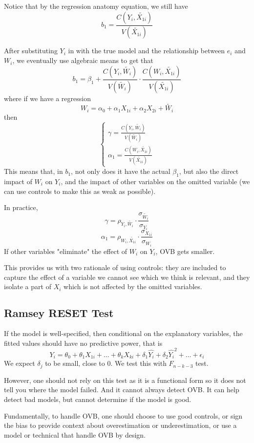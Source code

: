 Notice that by the regression anatomy equation, we still have
$$b_1 = \frac{C(Y_i, \tilde{X_{1i}})}{V(\tilde{X_{1i}})}$$

After substituting $Y_i$ in with the true model and the relationship between $e_i$ and $W_i$, we eventually use algebraic means to get that
$$b_1 = \beta_1 + \frac{C(Y_i, \tilde{W_i})}{V(\tilde{W_i})} \cdot \frac{C(W_i, \tilde{X_{1i}})}{V(\tilde{X_{1i}})}$$
where if we have a regression
$$W_i = \alpha_0 + \alpha_1 X_{1i} + \alpha_2 X_{2i} + \tilde{W_i}$$
then
$$\begin{cases}
    \gamma = \frac{C(Y_i, \tilde{W_i})}{V(\tilde{W_i})} \\
    \alpha_1 = \frac{C(W_i, \tilde{X_{1i}})}{V(\tilde{X_{1i}})}
\end{cases}$$
This means that, in $b_1$, not only does it have the actual $\beta_1$, but also the direct impact of $W_i$ on $Y_i$, and the impact of other variables on the omitted variable (we can use controls to make this as weak as possible).

In practice,
$$\gamma = \rho_{Y_i, \tilde{W_i}} \cdot \frac{\sigma_{\tilde{W_i}}}{\sigma_{Y_i}}$$
$$\alpha_1 = \rho_{W_i, \tilde{X_{1i}}} \cdot \frac{\sigma_{X_{1i}}}{\sigma_{W_i}}$$
If other variables "eliminate" the effect of $W_i$ on $Y_i$, OVB gets smaller.

This provides us with two rationale of using controls: they are included to capture the effect of a variable we cannot see which we think is relevant, and they isolate a part of $X_i$ which is not affected by the omitted variables.

\subsection{Ramsey RESET Test}
If the model is well-specified, then conditional on the explanatory variables, the fitted values should have no predictive power, that is
$$Y_i = \theta_0 + \theta_1 X_{1i} + \dots + \theta_k X_{ki} + \delta_1 \hat{Y_i} + \delta_2 \hat{Y_i}^2 + \dots + \epsilon_i$$
We expect $\delta_j$ to be small, close to $0$. We test this with $F_{n - k -3}$ test.

However, one should not rely on this test as it is a functional form so it does not tell you where the model failed. And it cannot always detect OVB. It can help detect bad models, but cannot determine if the model is good.

Fundamentally, to handle OVB, one should choose to use good controls, or sign the bias to provide context about overestimation or underestimation, or use a model or technical that handle OVB by design.

\newpage